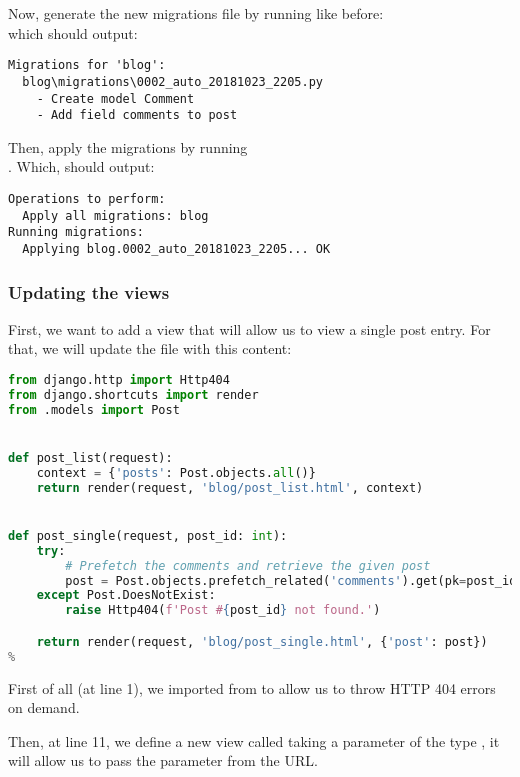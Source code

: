         Now, generate the new migrations file by running like before:\\
         which should output:
        
        \begin{lstlisting}[numbers=none]
Migrations for 'blog':
  blog\migrations\0002_auto_20181023_2205.py
    - Create model Comment
    - Add field comments to post
        \end{lstlisting}
        
        Then, apply the migrations by running\\
        . Which, should output:
        
        \begin{lstlisting}[numbers=none]
Operations to perform:
  Apply all migrations: blog
Running migrations:
  Applying blog.0002_auto_20181023_2205... OK
        \end{lstlisting}
    
    \subsubsection{Updating the views}
        First, we want to add a view that will allow us to view a single 
        post entry. For that, we will update the  file with this content:
        
        \begin{lstlisting}[language=python, title=blog/views.py]
from django.http import Http404
from django.shortcuts import render
from .models import Post


def post_list(request):
    context = {'posts': Post.objects.all()}
    return render(request, 'blog/post_list.html', context)


def post_single(request, post_id: int):
    try:
        # Prefetch the comments and retrieve the given post
        post = Post.objects.prefetch_related('comments').get(pk=post_id)
    except Post.DoesNotExist:
        raise Http404(f'Post #{post_id} not found.')

    return render(request, 'blog/post_single.html', {'post': post})
%
        \end{lstlisting}
        
        First of all (at line 1), we imported  from 
        to allow us to throw HTTP 404 errors on demand.
        
        Then, at line 11, we define a new view called  
        taking a  parameter of the type ,
        it will allow us to pass the  parameter from the URL.
        
